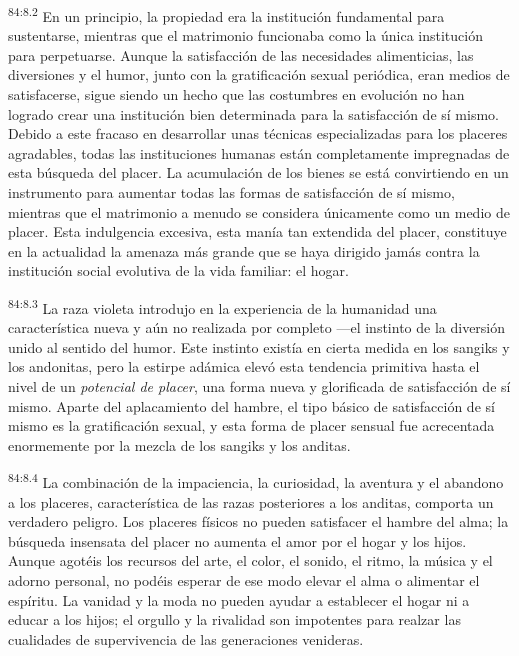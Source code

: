 \documentclass[twoside, 11pt]{book}
\begin{document}
\par
\textsuperscript{84:8.2} En un principio, la propiedad era la institución fundamental para sustentarse, mientras que el matrimonio funcionaba como la única institución para perpetuarse. Aunque la satisfacción de las necesidades alimenticias, las diversiones y el humor, junto con la gratificación sexual periódica, eran medios de satisfacerse, sigue siendo un hecho que las costumbres en evolución no han logrado crear una institución bien determinada para la satisfacción de sí mismo. Debido a este fracaso en desarrollar unas técnicas especializadas para los placeres agradables, todas las instituciones humanas están completamente impregnadas de esta búsqueda del placer. La acumulación de los bienes se está convirtiendo en un instrumento para aumentar todas las formas de satisfacción de sí mismo, mientras que el matrimonio a menudo se considera únicamente como un medio de placer. Esta indulgencia excesiva, esta manía tan extendida del placer, constituye en la actualidad la amenaza más grande que se haya dirigido jamás contra la institución social evolutiva de la vida familiar: el hogar.

\par
\textsuperscript{84:8.3} La raza violeta introdujo en la experiencia de la humanidad una característica nueva y aún no realizada por completo ---el instinto de la diversión unido al sentido del humor. Este instinto existía en cierta medida en los sangiks y los andonitas, pero la estirpe adámica elevó esta tendencia primitiva hasta el nivel de un \textit{potencial de placer}, una forma nueva y glorificada de satisfacción de sí mismo. Aparte del aplacamiento del hambre, el tipo básico de satisfacción de sí mismo es la gratificación sexual, y esta forma de placer sensual fue acrecentada enormemente por la mezcla de los sangiks y los anditas.

\par
\textsuperscript{84:8.4} La combinación de la impaciencia, la curiosidad, la aventura y el abandono a los placeres, característica de las razas posteriores a los anditas, comporta un verdadero peligro. Los placeres físicos no pueden satisfacer el hambre del alma; la búsqueda insensata del placer no aumenta el amor por el hogar y los hijos. Aunque agotéis los recursos del arte, el color, el sonido, el ritmo, la música y el adorno personal, no podéis esperar de ese modo elevar el alma o alimentar el espíritu. La vanidad y la moda no pueden ayudar a establecer el hogar ni a educar a los hijos; el orgullo y la rivalidad son impotentes para realzar las cualidades de supervivencia de las generaciones venideras.
\end{document}
